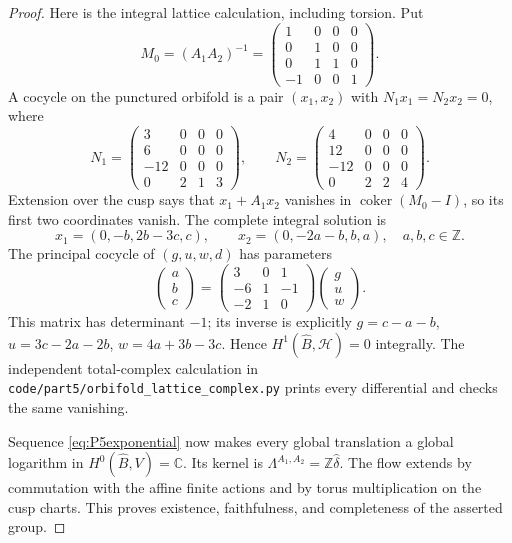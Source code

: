 \begin{proof}
Here is the integral lattice calculation, including torsion.  Put
\[
 M_0=(A_1A_2)^{-1}=\begin{pmatrix}1&0&0&0\\0&1&0&0\\0&1&1&0\\-1&0&0&1\end{pmatrix}.
\]
A cocycle on the punctured orbifold is a pair $(x_1,x_2)$ with
$N_1x_1=N_2x_2=0$, where
\[
 N_1=\begin{pmatrix}3&0&0&0\\6&0&0&0\\-12&0&0&0\\0&2&1&3\end{pmatrix},\qquad
 N_2=\begin{pmatrix}4&0&0&0\\12&0&0&0\\-12&0&0&0\\0&2&2&4\end{pmatrix}.
\]
Extension over the cusp says that $x_1+A_1x_2$ vanishes in
$\operatorname{coker}(M_0-I)$, so its first two coordinates vanish.
The complete integral solution is
\[
 x_1=(0,-b,2b-3c,c),\qquad x_2=(0,-2a-b,b,a),\quad a,b,c\in\mathbb Z.
\]
The principal cocycle of $(g,u,w,d)$ has parameters
\[
 \begin{pmatrix}a\\b\\c\end{pmatrix}
 =\begin{pmatrix}3&0&1\\-6&1&-1\\-2&1&0\end{pmatrix}
  \begin{pmatrix}g\\u\\w\end{pmatrix}.
\]
This matrix has determinant $-1$; its inverse is explicitly
$g=c-a-b$, $u=3c-2a-2b$, $w=4a+3b-3c$.  Hence
$H^1(\widehat B,\mathcal H)=0$ integrally.  The independent total-complex
calculation in \texttt{code/part5/orbifold\_lattice\_complex.py} prints
every differential and checks the same vanishing.

Sequence \eqref{eq:P5exponential} now makes every global translation a
global logarithm in $H^0(\widehat B,V)=\mathbb C$.  Its kernel is
$\Lambda^{A_1,A_2}=\mathbb Z\widehat\delta$.  The flow extends by
commutation with the affine finite actions and by torus multiplication
on the cusp charts.  This proves existence, faithfulness, and
completeness of the asserted group.
\end{proof}

